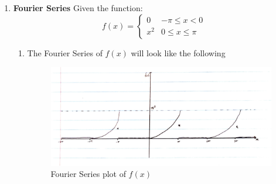 \documentclass[12pt]{article}
\numberwithin{equation}{section}
\begin{document}
\begin{enumerate}
        \item \textbf{Fourier Series}\newline
        Given the function:
        \begin{equation*}
            f(x)=
            \begin{cases}
                0 & -\pi\leq x<0\\
                x^2 & 0\leq x\leq\pi
            \end{cases}
        \end{equation*}
        \begin{enumerate}
            \item The Fourier Series of $f(x)$ will look like the following
            \begin{figure}[H]
                \begin{center}
                   \includegraphics[width=1\textwidth]{CT1Plot.pdf}
                   \caption{Fourier Series plot of $f(x)$}
                   \label{fig:FourierPlot}
                \end{center}
            \end{figure}
            

\end{enumerate}
\end{enumerate}
\end{document}
